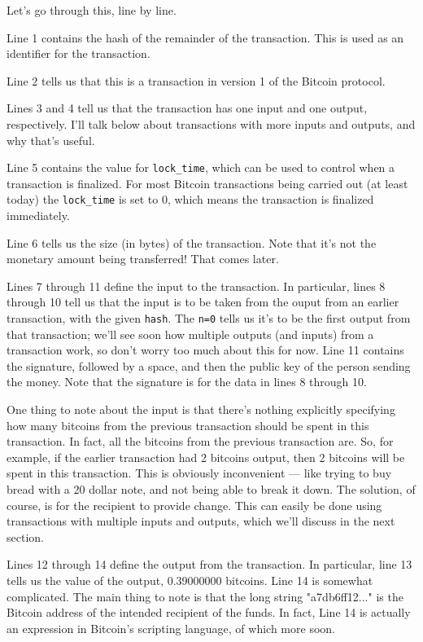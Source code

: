 \documentclass[12pt]{book}
\newcounter{example}[chapter]
\begin{document}
Let's go through this, line by line.

Line 1 contains the hash of the remainder of the transaction.  This is
used as an identifier for the transaction.

Line 2 tells us that this is a transaction in version 1 of the Bitcoin
protocol.

Lines 3 and 4 tell us that the transaction has one input and one
output, respectively.  I'll talk below about transactions with more
inputs and outputs, and why that's useful. 

Line 5 contains the value for \verb|lock_time|, which can be used to
control when a transaction is finalized.  For most Bitcoin
transactions being carried out (at least today) the \verb|lock_time|
is set to 0, which means the transaction is finalized immediately.

Line 6 tells us the size (in bytes) of the transaction.  Note that
it's not the monetary amount being transferred!  That comes later.

Lines 7 through 11 define the input to the transaction.  In
particular, lines 8 through 10 tell us that the input is to be taken
from the ouput from an earlier transaction, with the given
\verb|hash|.  The \verb|n=0| tells us it's to be the first output from
that transaction; we'll see soon how multiple outputs (and inputs)
from a transaction work, so don't worry too much about this for now.
Line 11 contains the signature, followed by a space, and then the
public key of the person sending the money.  Note that the signature
is for the data in lines 8 through 10. 

One thing to note about the input is that there's nothing explicitly
specifying how many bitcoins from the previous transaction should be
spent in this transaction.  In fact, all the bitcoins from the
previous transaction are.  So, for example, if the earlier transaction
had 2 bitcoins output, then 2 bitcoins will be spent in this
transaction.  This is obviously inconvenient --- like trying to buy
bread with a 20 dollar note, and not being able to break it down.  The
solution, of course, is for the recipient to provide change.  This can
easily be done using transactions with multiple inputs and outputs,
which we'll discuss in the next section.

Lines 12 through 14 define the output from the transaction.  In
particular, line 13 tells us the value of the output, 0.39000000
bitcoins.  Line 14 is somewhat complicated.  The main thing to note is
that the long string "a7db6ff12..." is the Bitcoin address of the
intended recipient of the funds.  In fact, Line 14 is actually an
expression in Bitcoin's scripting language, of which more soon.
\end{document}
